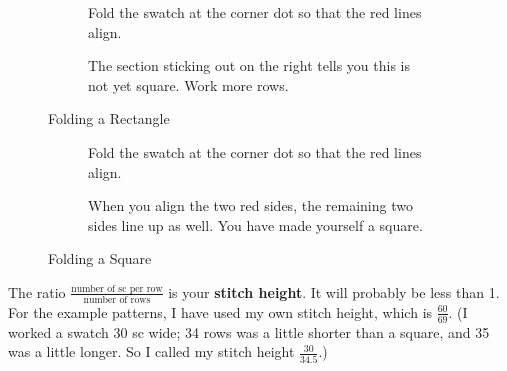 \documentclass[openany]{book}
\begin{document}
\begin{figure}[H]
\begin{subfigure}[t]{.4\textwidth}
		\centering
{}
\caption{Fold the swatch at the corner dot so that the red lines align.}
\end{subfigure}\hfill
%
\begin{subfigure}[t]{.4\textwidth}
		\centering
{}
\caption{The section sticking out on the right tells you this is not yet square. Work more rows.}
\end{subfigure}
\caption{Folding a Rectangle}\label{fig:rect}
\end{figure}

\begin{figure}[H]
\begin{subfigure}[t]{.4\textwidth}
		\centering
{}
\caption{Fold the swatch at the corner dot so that the red lines align.}
\end{subfigure}\hfill
%
\begin{subfigure}[t]{.4\textwidth}
		\centering
{}
\caption{When you align the two red sides, the remaining two sides line up as well. You have made yourself a square.}
\end{subfigure}
\caption{Folding a Square}\label{fig:square}
\end{figure}


The ratio $\frac{\text{number of sc per row}}{\text{number of rows}}$ is your \textbf{stitch height}. It will probably be less than 1. For the example patterns, I have used my own stitch height, which is $\frac{60}{69}$. (I worked a swatch 30 sc wide; 34 rows was a little shorter than a square, and 35 was a little longer. So I called my stitch height $\frac{30}{34.5}$.)
\end{document}
